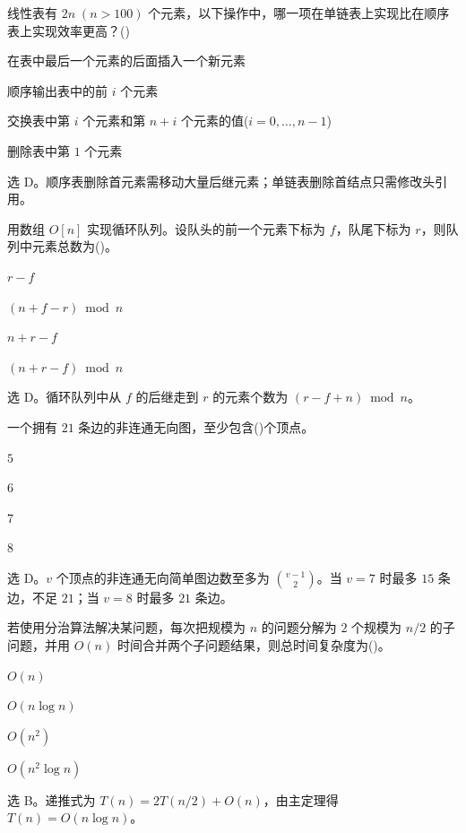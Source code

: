 \begin{question}
线性表有 $2n\;(n>100)$ 个元素，以下操作中，哪一项在单链表上实现比在顺序表上实现效率更高？(\quad)
\begin{choiceoptions}[2]
  \item 在表中最后一个元素的后面插入一个新元素
  \item 顺序输出表中的前 $i$ 个元素
  \item 交换表中第 $i$ 个元素和第 $n+i$ 个元素的值($i=0,\ldots,n-1$)
  \item 删除表中第 $1$ 个元素
\end{choiceoptions}
\begin{solution}
选 D。顺序表删除首元素需移动大量后继元素；单链表删除首结点只需修改头引用。
\end{solution}
\end{question}

\begin{question}
用数组 $O[n]$ 实现循环队列。设队头的前一个元素下标为 $f$，队尾下标为 $r$，则队列中元素总数为(\quad)。
\begin{choiceoptions}[2]
  \item $r-f$
  \item $(n+f-r)\bmod n$
  \item $n+r-f$
  \item $(n+r-f)\bmod n$
\end{choiceoptions}
\begin{solution}
选 D。循环队列中从 $f$ 的后继走到 $r$ 的元素个数为 $(r-f+n)\bmod n$。
\end{solution}
\end{question}

\begin{question}
一个拥有 $21$ 条边的非连通无向图，至少包含(\quad)个顶点。
\begin{choiceoptions}[2]
  \item $5$
  \item $6$
  \item $7$
  \item $8$
\end{choiceoptions}
\begin{solution}
选 D。$v$ 个顶点的非连通无向简单图边数至多为 $\binom{v-1}{2}$。当 $v=7$ 时最多 $15$ 条边，不足 $21$；当 $v=8$ 时最多 $21$ 条边。
\end{solution}
\end{question}

\begin{question}
若使用分治算法解决某问题，每次把规模为 $n$ 的问题分解为 $2$ 个规模为 $n/2$ 的子问题，并用 $O(n)$ 时间合并两个子问题结果，则总时间复杂度为(\quad)。
\begin{choiceoptions}[1]
  \item $O(n)$
  \item $O(n\log n)$
  \item $O(n^2)$
  \item $O(n^2\log n)$
\end{choiceoptions}
\begin{solution}
选 B。递推式为 $T(n)=2T(n/2)+O(n)$，由主定理得 $T(n)=O(n\log n)$。
\end{solution}
\end{question}

